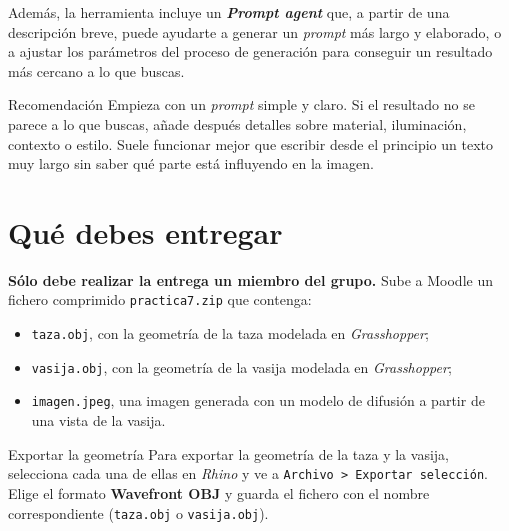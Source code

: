 \documentclass[
  spanish,
  11pt,
  a4paper,
  DIV=11,
  numbers=noendperiod]{scrartcl}
\providecommand{\tightlist}{\setlength{\itemsep}{0pt}\setlength{\parskip}{0pt}}
\begin{document}
Además, la herramienta incluye un \textbf{\emph{Prompt agent}} que, a partir de una descripción breve, puede ayudarte a generar un \emph{prompt} más largo y elaborado, o a ajustar los parámetros del proceso de generación para conseguir un resultado más cercano a lo que buscas.

\begin{PracticeNoteBox}{Recomendación}
Empieza con un \emph{prompt} simple y claro. Si el resultado no se parece a lo que buscas, añade después detalles sobre material, iluminación, contexto o estilo. Suele funcionar mejor que escribir desde el principio un texto muy largo sin saber qué parte está influyendo en la imagen.
\end{PracticeNoteBox}

\section{Qué debes entregar}
\label{que-debes-entregar}

\textbf{Sólo debe realizar la entrega un miembro del grupo.} Sube a Moodle un fichero comprimido \texttt{practica7.zip} que contenga:

\begin{itemize}
\tightlist
\item \texttt{taza.obj}, con la geometría de la taza modelada en \emph{Grasshopper};
\item \texttt{vasija.obj}, con la geometría de la vasija modelada en \emph{Grasshopper};
\item \texttt{imagen.jpeg}, una imagen generada con un modelo de difusión a partir de una vista de la vasija.
\end{itemize}

\begin{PracticeImportantBox}{Exportar la geometría}
Para exportar la geometría de la taza y la vasija, selecciona cada una de ellas en \emph{Rhino} y ve a \texttt{Archivo > Exportar selección}. Elige el formato \textbf{Wavefront OBJ} y guarda el fichero con el nombre correspondiente (\texttt{taza.obj} o \texttt{vasija.obj}).
\end{PracticeImportantBox}
\end{document}
